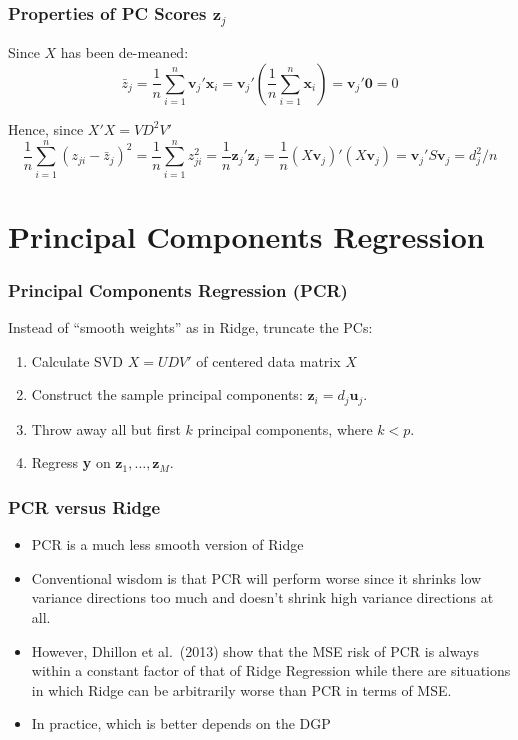 \begin{frame}
  \frametitle{Properties of PC Scores $\mathbf{z}_j$}

  Since $X$ has been de-meaned:
  \[
    \bar{z}_j = \frac{1}{n}\sum_{i=1}^n \mathbf{v}_j'\mathbf{x}_i = \mathbf{v}_j' \left( \frac{1}{n}\sum_{i=1}^n \mathbf{x}_i \right) = \mathbf{v}_j' \mathbf{0} = 0
  \]

  Hence, since $X'X = VD^2V'$
  \[
    \frac{1}{n}\sum_{i=1}^n (z_{ji} - \bar{z}_j)^2 = \frac{1}{n} \sum_{i=1}^n z_{ji}^2 = \frac{1}{n} \mathbf{z}_j'\mathbf{z}_j = \frac{1}{n}\left( X\mathbf{v}_j \right)'\left( X\mathbf{v}_j \right) = \mathbf{v}_j' S\mathbf{v}_j = d_j^2/n
  \]

  
\end{frame}
\section{Principal Components Regression}
\begin{frame}
  \frametitle{Principal Components Regression (PCR)}

  \small

Instead of ``smooth weights'' as in Ridge, truncate the PCs:
	\begin{enumerate}
    \item Calculate SVD $X=UDV'$ of \alert{centered} data matrix $X$
		\item Construct the sample principal components: $\mathbf{z}_i = d_j \mathbf{u}_j$.
		\item Throw away all but first $k$ principal components, where $k <p$.
		\item Regress \textbf{y} on $\mathbf{z}_1, \hdots, \mathbf{z}_M$. 
	\end{enumerate}

\end{frame}
\begin{frame}
  \frametitle{PCR versus Ridge}
  \begin{itemize}
    \item PCR is a much less smooth version of Ridge
    \item Conventional wisdom is that PCR will perform worse since it shrinks low variance directions too much and doesn't shrink high variance directions at all.
  \item However, Dhillon et al.\ (2013) show that the MSE risk of PCR is always within a constant factor of that of Ridge Regression while there are situations in which Ridge can be arbitrarily worse than PCR in terms of MSE. 
    \item In practice, which is better depends on the DGP
  \end{itemize}
\end{frame}
